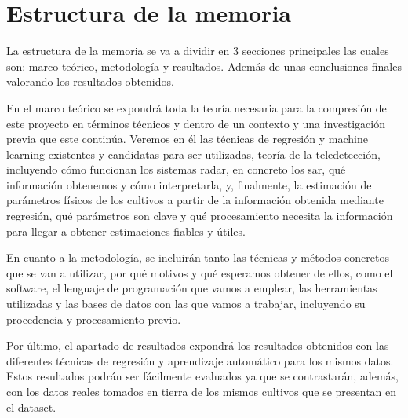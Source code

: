 \section{Estructura de la memoria}
\par La estructura de la memoria se va a dividir en 3 secciones principales las cuales son: marco teórico, metodología y resultados. Además de unas conclusiones finales valorando los resultados obtenidos.
\\
\par En el marco teórico se expondrá toda la teoría necesaria para la compresión de este proyecto en términos técnicos y dentro de un contexto y una investigación previa que este continúa. Veremos en él las técnicas de regresión y machine learning existentes y candidatas para ser utilizadas, teoría de la teledetección, incluyendo cómo funcionan los sistemas radar, en concreto los \gls{sar}, qué información obtenemos y cómo interpretarla, y, finalmente, la estimación de parámetros físicos de los cultivos a partir de la información obtenida mediante regresión, qué parámetros son clave y qué procesamiento necesita la información para llegar a obtener estimaciones fiables y útiles. 
\\
\par En cuanto a la metodología, se incluirán tanto las técnicas y métodos concretos que se van a utilizar, por qué motivos y qué esperamos obtener de ellos, como el software, el lenguaje de programación que vamos a emplear, las herramientas utilizadas y las bases de datos con las que vamos a trabajar, incluyendo su procedencia y procesamiento previo. 
\\
\par Por último, el apartado de resultados expondrá los resultados obtenidos con las diferentes técnicas de regresión y aprendizaje automático para los mismos datos. Estos resultados podrán ser fácilmente evaluados ya que se contrastarán, además, con los datos reales tomados en tierra de los mismos cultivos que se presentan en el dataset. 
\\

